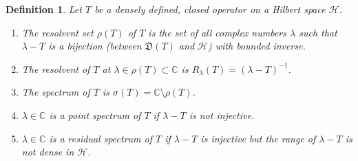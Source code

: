\documentclass[a4paper,10pt]{amsart}
\newtheorem{definition}{Definition}[section]
\newcommand{\HHH}{\mathcal H} %
\newcommand{\DDD}{\mathfrak D}
\newcommand{\C}{\mathbb C} %
\begin{document}
\begin{definition}
   Let $T$ be a densely defined, closed operator on a Hilbert space $\HHH$.
   \begin{enumerate}
       \item The resolvent set $\rho(T)$ of $T$ is the set of all complex
           numbers $\lambda$ such that $\lambda - T$ is a bijection
           (between $\DDD(T)$ and $\HHH$) with bounded inverse.
       \item The resolvent of $T$ at $\lambda \in \rho(T) \subset \C$ is
           $R_{\lambda}(T) = (\lambda -T)^{-1}$.
       \item The spectrum of $T$ is $\sigma(T) = \C \setminus \rho(T)$.
       \item $\lambda \in \C$ is a point spectrum of $T$ if $\lambda - T$
           is not injective.
       \item $\lambda \in \C$ is a residual spectrum of $T$ if $\lambda -T$
           is injective but the range of $\lambda - T$ is not dense in 
           $\HHH$.
   \end{enumerate}
\end{definition}
\end{document}
